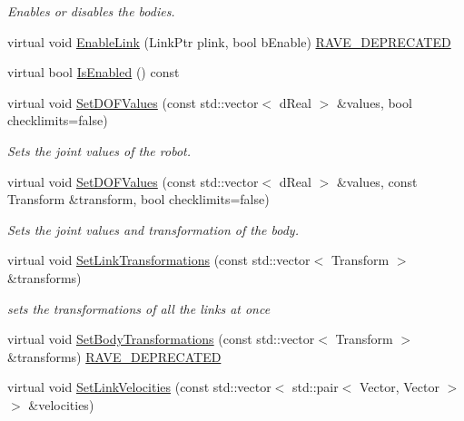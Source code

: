 \begin{DoxyCompactItemize}
\begin{DoxyCompactList}\small\item\em Enables or disables the bodies. \item\end{DoxyCompactList}\item 
virtual void \hyperlink{classOpenRAVE_1_1KinBody_af0009d4f176dc8f0d02c5dd3b96226f1}{EnableLink} (LinkPtr plink, bool bEnable) \hyperlink{namespaceOpenRAVE_af23fc4c2c72950a8c02f38ef71680bc6}{RAVE\_\-DEPRECATED}
\item 
virtual bool \hyperlink{classOpenRAVE_1_1KinBody_ab093c91e2859f12d929fe8665e67a8e8}{IsEnabled} () const 
\item 
virtual void \hyperlink{classOpenRAVE_1_1KinBody_a30ca49e63e7794762a374f53585d3b8e}{SetDOFValues} (const std::vector$<$ dReal $>$ \&values, bool checklimits=false)
\begin{DoxyCompactList}\small\item\em Sets the joint values of the robot. \item\end{DoxyCompactList}\item 
virtual void \hyperlink{classOpenRAVE_1_1KinBody_ad75a7828a47c91e1c572c111a6779fcd}{SetDOFValues} (const std::vector$<$ dReal $>$ \&values, const Transform \&transform, bool checklimits=false)
\begin{DoxyCompactList}\small\item\em Sets the joint values and transformation of the body. \item\end{DoxyCompactList}\item 
\hypertarget{classOpenRAVE_1_1KinBody_ad005f2eda60cafaec07e183e9fbfe77d}{
virtual void \hyperlink{classOpenRAVE_1_1KinBody_ad005f2eda60cafaec07e183e9fbfe77d}{SetLinkTransformations} (const std::vector$<$ Transform $>$ \&transforms)}
\label{classOpenRAVE_1_1KinBody_ad005f2eda60cafaec07e183e9fbfe77d}

\begin{DoxyCompactList}\small\item\em sets the transformations of all the links at once \item\end{DoxyCompactList}\item 
virtual void \hyperlink{classOpenRAVE_1_1KinBody_a0cbd54ab25b8c1f3466092b54180d266}{SetBodyTransformations} (const std::vector$<$ Transform $>$ \&transforms) \hyperlink{namespaceOpenRAVE_af23fc4c2c72950a8c02f38ef71680bc6}{RAVE\_\-DEPRECATED}
\item 
\hypertarget{classOpenRAVE_1_1KinBody_a6b7837855cf483cc6a87553a3dcc16ec}{
virtual void \hyperlink{classOpenRAVE_1_1KinBody_a6b7837855cf483cc6a87553a3dcc16ec}{SetLinkVelocities} (const std::vector$<$ std::pair$<$ Vector, Vector $>$ $>$ \&velocities)}
\label{classOpenRAVE_1_1KinBody_a6b7837855cf483cc6a87553a3dcc16ec}


\end{DoxyCompactItemize}
